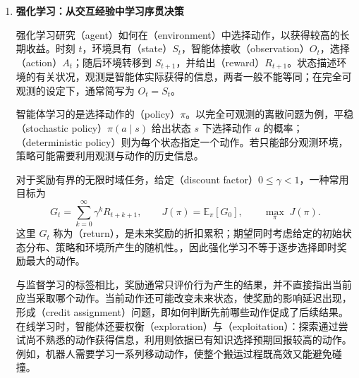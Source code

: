 \documentclass[UTF8,12pt,a4paper,fontset=fandol]{ctexbook}
\begin{document}
\begin{enumerate}
  无监督学习并不意味着没有优化目标。以 $K$ 均值聚类（$K$-means clustering）为例，给定 $x_i\in\mathbb{R}^{d}$ 和簇数 $K$，可以求解
  \begin{equation}
    \min_{\mu_1,\ldots,\mu_K,\,c_1,\ldots,c_n}
    \sum_{i=1}^{n}\lVert x_i-\mu_{c_i}\rVert_2^2,
    \qquad c_i\in\{1,\ldots,K\},
  \end{equation}
  其中 $\mu_k\in\mathbb{R}^{d}$ 是第 $k$ 个簇的中心，$c_i$ 是算法为样本 $x_i$ 学到的簇编号。与监督学习的标签不同，$c_i$ 不是预先给定的目标答案。算法发现的结构取决于特征表示、距离度量和建模假设，也未必与人们期望的语义类别一致。

  \item \textbf{强化学习：从交互经验中学习序贯决策}

  强化学习研究（agent）如何在（environment）中选择动作，以获得较高的长期收益。时刻 $t$，环境具有（state）$S_t$，智能体接收（observation）$O_t$，选择（action）$A_t$；随后环境转移到 $S_{t+1}$，并给出（reward）$R_{t+1}$。状态描述环境的有关状况，观测是智能体实际获得的信息，两者一般不能等同；在完全可观测的设定下，通常简写为 $O_t=S_t$。

  智能体学习的是选择动作的（policy）$\pi$。以完全可观测的离散问题为例，平稳（stochastic policy）$\pi(a\mid s)$ 给出状态 $s$ 下选择动作 $a$ 的概率；（deterministic policy）则为每个状态指定一个动作。若只能部分观测环境，策略可能需要利用观测与动作的历史信息。

  对于奖励有界的无限时域任务，给定（discount factor）$0\leq\gamma<1$，一种常用目标为
  \begin{equation}
    G_t=\sum_{k=0}^{\infty}\gamma^k R_{t+k+1},
    \qquad J(\pi)=\mathbb{E}_{\pi}[G_0],
    \qquad \max_{\pi}\;J(\pi).
  \end{equation}
  这里 $G_t$ 称为（return），是未来奖励的折扣累积；期望同时考虑给定的初始状态分布、策略和环境所产生的随机性。，因此强化学习不等于逐步选择即时奖励最大的动作。

  与监督学习的标签相比，奖励通常只评价行为产生的结果，并不直接指出当前应当采取哪个动作。当前动作还可能改变未来状态，使奖励的影响延迟出现，形成（credit assignment）问题，即如何判断先前哪些动作促成了后续结果。在线学习时，智能体还要权衡（exploration）与（exploitation）：探索通过尝试尚不熟悉的动作获得信息，利用则依据已有知识选择预期回报较高的动作。例如，机器人需要学习一系列移动动作，使整个搬运过程既高效又能避免碰撞。
\end{enumerate}
\end{document}
